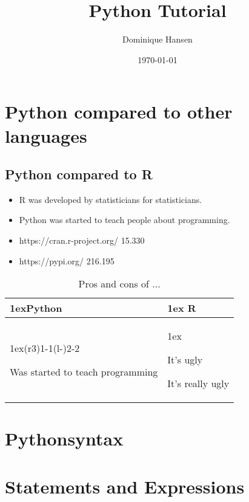 \documentclass{article}
\title{Python Tutorial}
\author{Dominique Hansen}
\date{\today}
\begin{document}
\maketitle

\section{Python compared to other languages}

\subsection{Python compared to R}

\begin{itemize}
    \item R was developed by statisticians for statisticians.
    \item Python was started to teach people about programming.
    \item https://cran.r-project.org/ 15.330
    \item https://pypi.org/ 216.195
\end{itemize}

\begin{table}
\begin{tabularx}{\linewidth}{>{\parskip1ex}X@{\kern4\tabcolsep}>{\parskip1ex}X}
\toprule
\hfil\bfseries Python
&
\hfil\bfseries R
\\\cmidrule(r{3\tabcolsep}){1-1}\cmidrule(l{-\tabcolsep}){2-2}

Was started to teach programming

&

It's ugly\par
It's really ugly\par

\\\bottomrule
\end{tabularx}
\caption{Pros and cons of ...}
\end{table}



\section{Pythonsyntax}
\section{Statements and Expressions}
\end{document}

